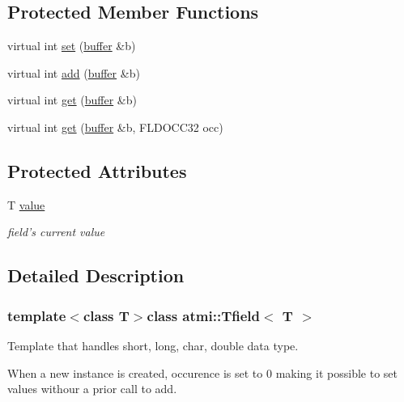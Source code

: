 \subsection*{Protected Member Functions}
\begin{DoxyCompactItemize}
\item 
virtual int \hyperlink{classatmi_1_1_tfield_a7bd1997e976116990ad0e2072320db77}{set} (\hyperlink{classatmi_1_1buffer}{buffer} \&b)
\item 
virtual int \hyperlink{classatmi_1_1_tfield_a4962b3aa080aba4ecffc7f3fa98be2da}{add} (\hyperlink{classatmi_1_1buffer}{buffer} \&b)
\item 
virtual int \hyperlink{classatmi_1_1_tfield_aa70ce8893913c8f3d968cae72f2cdd11}{get} (\hyperlink{classatmi_1_1buffer}{buffer} \&b)
\item 
virtual int \hyperlink{classatmi_1_1_tfield_ae8de2dd360d04fc2465e4169b239c222}{get} (\hyperlink{classatmi_1_1buffer}{buffer} \&b, F\+L\+D\+O\+C\+C32 occ)
\end{DoxyCompactItemize}
\subsection*{Protected Attributes}
\begin{DoxyCompactItemize}
\item 
\hypertarget{classatmi_1_1_tfield_a89852f63b07d2f6d27d9866b030d1c5d}{T \hyperlink{classatmi_1_1_tfield_a89852f63b07d2f6d27d9866b030d1c5d}{value}}\label{classatmi_1_1_tfield_a89852f63b07d2f6d27d9866b030d1c5d}

\begin{DoxyCompactList}\small\item\em field's current value \end{DoxyCompactList}\end{DoxyCompactItemize}


\subsection{Detailed Description}
\subsubsection*{template$<$class T$>$class atmi\+::\+Tfield$<$ T $>$}



Template that handles short, long, char, double data type.

When a new instance is created, occurence is set to 0 making it possible to set values withour a prior call to add. 

